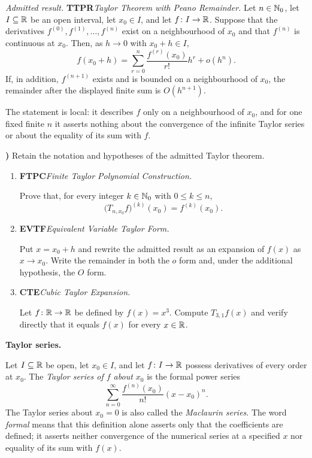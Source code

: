 \documentclass[10pt,a4paper]{article}
\newcounter{examquestion}
\newcommand{\examquestion}[1]{%
  \Needspace{5\baselineskip}%
  \refstepcounter{examquestion}%
  \par\addvspace{0.8\baselineskip}%
  \noindent\textbf{\theexamquestion)}\enspace #1\par
}
\newenvironment{subquestions}
  {\begin{enumerate}[label=\alph*),leftmargin=2.1em]}
  {\end{enumerate}}
\newcommand{\nameditem}[2]{%
  \textbf{\textsf{#1}}\enspace\emph{#2.}\enspace
}
\newcommand{\admitted}[3]{%
  \par\smallskip\noindent\emph{Admitted result.}\enspace
  \nameditem{#1}{#2}#3\par
}
\newcommand{\concept}[1]{%
  \par\addvspace{0.55\baselineskip}\noindent\textbf{#1.}\enspace
}
\begin{document}
\admitted{TTPR}{Taylor Theorem with Peano Remainder}{Let $n\in\mathbb{N}_0$, let
$I\subseteq\mathbb{R}$ be an open interval, let $x_0\in I$, and let
$f\colon I\to\mathbb{R}$.  Suppose that the derivatives
$f^{(0)},f^{(1)},\ldots,f^{(n)}$ exist on a neighbourhood of $x_0$ and
that $f^{(n)}$ is continuous at $x_0$.  Then, as $h\to0$ with
$x_0+h\in I$,
\[
  f(x_0+h)
    =\sum_{r=0}^{n}\frac{f^{(r)}(x_0)}{r!}h^r+o(h^n).
\]
If, in addition, $f^{(n+1)}$ exists and is bounded on a neighbourhood of
$x_0$, the remainder after the displayed finite sum is $O(h^{n+1})$.}

The statement is local: it describes $f$ only on a neighbourhood of $x_0$,
and for one fixed finite $n$ it asserts nothing about the convergence of the
infinite Taylor series or about the equality of its sum with $f$.

\examquestion{\label{q:taylor}
Retain the notation and hypotheses of the admitted Taylor theorem.
\begin{subquestions}
  \item \nameditem{FTPC}{Finite Taylor Polynomial Construction}
  Prove that, for every integer $k\in\mathbb{N}_0$ with $0\leq k\leq n$,
  \[
    \bigl(T_{n,x_0}f\bigr)^{(k)}(x_0)=f^{(k)}(x_0).
  \]

  \item \nameditem{EVTF}{Equivalent Variable Taylor Form}
  Put $x=x_0+h$ and rewrite the admitted result as an expansion of
  $f(x)$ as $x\to x_0$.  Write the remainder in both the $o$ form and,
  under the additional hypothesis, the $O$ form.

  \item \nameditem{CTE}{Cubic Taylor Expansion}
  Let $f\colon\mathbb{R}\to\mathbb{R}$ be defined by $f(x)=x^3$.  Compute
  $T_{3,1}f(x)$ and verify directly that it equals $f(x)$ for every
  $x\in\mathbb{R}$.
\end{subquestions}}

\concept{Taylor series}
Let $I\subseteq\mathbb{R}$ be open, let $x_0\in I$, and let
$f\colon I\to\mathbb{R}$ possess derivatives of every order at $x_0$.
The \emph{Taylor series of $f$ about $x_0$} is the formal power series
\[
  \sum_{n=0}^{\infty}
    \frac{f^{(n)}(x_0)}{n!}(x-x_0)^n.
\]
The Taylor series about $x_0=0$ is also called the \emph{Maclaurin
series}.  The word \emph{formal} means that this definition alone asserts
only that the coefficients are defined; it asserts neither convergence of
the numerical series at a specified $x$ nor equality of its sum with $f(x)$.
\end{document}
